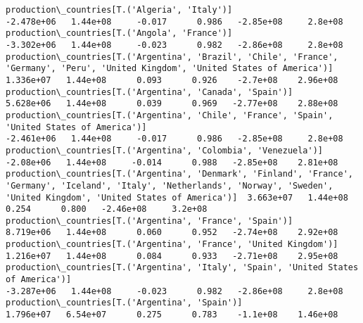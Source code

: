 \documentclass[11pt]{article}
\begin{document}
\begin{Verbatim}[commandchars=\\\{\}]
production\_countries[T.('Algeria', 'Italy')]                                                                                                                                          -2.478e+06   1.44e+08     -0.017      0.986   -2.85e+08     2.8e+08
production\_countries[T.('Angola', 'France')]                                                                                                                                          -3.302e+06   1.44e+08     -0.023      0.982   -2.86e+08     2.8e+08
production\_countries[T.('Argentina', 'Brazil', 'Chile', 'France', 'Germany', 'Peru', 'United Kingdom', 'United States of America')]                                                    1.336e+07   1.44e+08      0.093      0.926    -2.7e+08    2.96e+08
production\_countries[T.('Argentina', 'Canada', 'Spain')]                                                                                                                               5.628e+06   1.44e+08      0.039      0.969   -2.77e+08    2.88e+08
production\_countries[T.('Argentina', 'Chile', 'France', 'Spain', 'United States of America')]                                                                                         -2.461e+06   1.44e+08     -0.017      0.986   -2.85e+08     2.8e+08
production\_countries[T.('Argentina', 'Colombia', 'Venezuela')]                                                                                                                         -2.08e+06   1.44e+08     -0.014      0.988   -2.85e+08    2.81e+08
production\_countries[T.('Argentina', 'Denmark', 'Finland', 'France', 'Germany', 'Iceland', 'Italy', 'Netherlands', 'Norway', 'Sweden', 'United Kingdom', 'United States of America')]  3.663e+07   1.44e+08      0.254      0.800   -2.46e+08     3.2e+08
production\_countries[T.('Argentina', 'France', 'Spain')]                                                                                                                               8.719e+06   1.44e+08      0.060      0.952   -2.74e+08    2.92e+08
production\_countries[T.('Argentina', 'France', 'United Kingdom')]                                                                                                                      1.216e+07   1.44e+08      0.084      0.933   -2.71e+08    2.95e+08
production\_countries[T.('Argentina', 'Italy', 'Spain', 'United States of America')]                                                                                                   -3.287e+06   1.44e+08     -0.023      0.982   -2.86e+08     2.8e+08
production\_countries[T.('Argentina', 'Spain')]                                                                                                                                         1.796e+07   6.54e+07      0.275      0.783    -1.1e+08    1.46e+08

\end{Verbatim}
\end{document}
